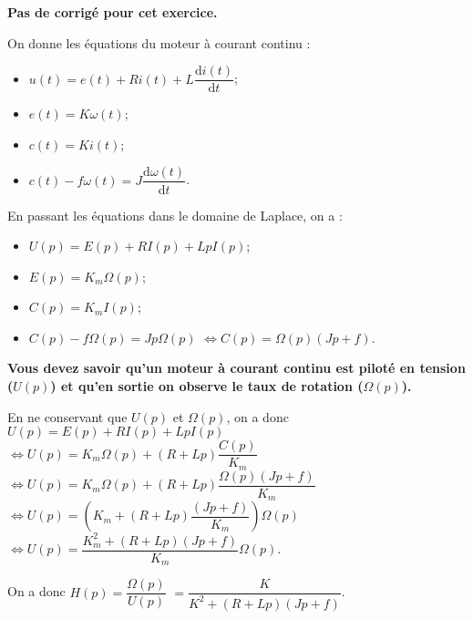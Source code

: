 \normaltrue \difficilefalse \tdifficilefalse
\correctiontrue


\setcounter{question}{0}
\ifcorrection
\else
\textbf{Pas de corrigé pour cet exercice.}
\fi


\ifprof 
\else
On donne les équations du moteur à courant continu :
\begin{itemize}
\item $u(t) = e(t)+ Ri(t) +L \dfrac{\text{d}i(t)}{\text{d} t}$;
\item $e(t)=K\omega(t)$;
\item $c(t)=Ki(t)$;
\item $c(t)- f\omega(t)=J\dfrac{\text{d}\omega(t)}{\text{d} t}$.
\end{itemize}
\fi

\ifprof
En passant les équations dans le domaine de Laplace, on a : 
\begin{itemize}
\item $U(p) = E(p)+ RI(p) +LpI(p)$;
\item $E(p)=K_m\Omega(p)$;
\item $C(p)=K_mI(p)$;
\item $C(p)- f\Omega(p)=Jp\Omega(p)$ $\Leftrightarrow C(p)=\Omega(p)\left( Jp +f \right)$.
\end{itemize}

\textbf{Vous devez savoir qu'un moteur à courant continu est piloté en tension ($U(p)$) et qu'en sortie on observe le taux de rotation ($\Omega(p)$). }

En ne conservant que $U(p)$ et $\Omega(p)$, on a donc
$U(p) = E(p)+ RI(p) +LpI(p)$
$ \Leftrightarrow U(p) = K_m\Omega(p)+ \left(R +Lp\right)\dfrac{C(p)}{K_m}$
$ \Leftrightarrow U(p) = K_m\Omega(p)+ \left(R +Lp\right)\dfrac{\Omega(p)\left( Jp +f \right)}{K_m}$
$ \Leftrightarrow U(p) = \left(K_m+ \left(R +Lp\right)\dfrac{\left( Jp +f \right)}{K_m}\right)\Omega(p)$
$ \Leftrightarrow U(p) =  \dfrac{K_m^2 + \left(R +Lp\right)\left( Jp +f \right)}{K_m}\Omega(p)$.

On a donc $H(p)=\dfrac{\Omega(p)}{U(p)}$ $=\dfrac{K}{K^2 +\left(R +Lp\right) \left( Jp +f \right)} $.

\else
\fi

